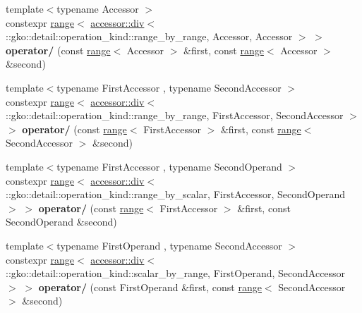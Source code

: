\begin{DoxyCompactItemize}
\item 
\mbox{\label{namespacegko_a83c291b8175c3a41649bdfdfde9d7485}} 
{\footnotesize template$<$typename Accessor $>$ }\\constexpr \hyperlink{classgko_1_1range}{range}$<$ \hyperlink{structgko_1_1accessor_1_1div}{accessor\+::div}$<$ \+::gko\+::detail\+::operation\+\_\+kind\+::range\+\_\+by\+\_\+range, Accessor, Accessor $>$ $>$ {\bfseries operator/} (const \hyperlink{classgko_1_1range}{range}$<$ Accessor $>$ \&first, const \hyperlink{classgko_1_1range}{range}$<$ Accessor $>$ \&second)
\item 
\mbox{\label{namespacegko_a40c33c78a06d2e2bae92f7f1cc254a3e}} 
{\footnotesize template$<$typename First\+Accessor , typename Second\+Accessor $>$ }\\constexpr \hyperlink{classgko_1_1range}{range}$<$ \hyperlink{structgko_1_1accessor_1_1div}{accessor\+::div}$<$ \+::gko\+::detail\+::operation\+\_\+kind\+::range\+\_\+by\+\_\+range, First\+Accessor, Second\+Accessor $>$ $>$ {\bfseries operator/} (const \hyperlink{classgko_1_1range}{range}$<$ First\+Accessor $>$ \&first, const \hyperlink{classgko_1_1range}{range}$<$ Second\+Accessor $>$ \&second)
\item 
\mbox{\label{namespacegko_a3b921aed556c1773376ad2feb082fafb}} 
{\footnotesize template$<$typename First\+Accessor , typename Second\+Operand $>$ }\\constexpr \hyperlink{classgko_1_1range}{range}$<$ \hyperlink{structgko_1_1accessor_1_1div}{accessor\+::div}$<$ \+::gko\+::detail\+::operation\+\_\+kind\+::range\+\_\+by\+\_\+scalar, First\+Accessor, Second\+Operand $>$ $>$ {\bfseries operator/} (const \hyperlink{classgko_1_1range}{range}$<$ First\+Accessor $>$ \&first, const Second\+Operand \&second)
\item 
\mbox{\label{namespacegko_ad617073f36809325a11db56fc66d433e}} 
{\footnotesize template$<$typename First\+Operand , typename Second\+Accessor $>$ }\\constexpr \hyperlink{classgko_1_1range}{range}$<$ \hyperlink{structgko_1_1accessor_1_1div}{accessor\+::div}$<$ \+::gko\+::detail\+::operation\+\_\+kind\+::scalar\+\_\+by\+\_\+range, First\+Operand, Second\+Accessor $>$ $>$ {\bfseries operator/} (const First\+Operand \&first, const \hyperlink{classgko_1_1range}{range}$<$ Second\+Accessor $>$ \&second)

\end{DoxyCompactItemize}
